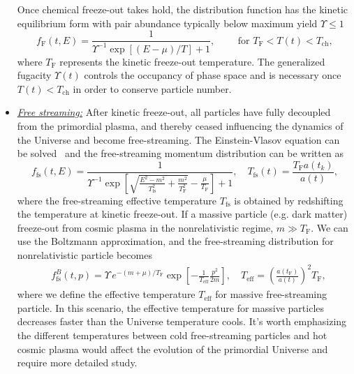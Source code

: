 \begin{itemize}
Once chemical freeze-out takes hold, the distribution function has the kinetic equilibrium form with pair abundance typically below maximum yield $\Upsilon \le 1$
\begin{equation}\label{kinetic_equilib}
f_\mathrm{F}(t,E)=\frac{1}{\Upsilon^{-1}\exp[(E-\mu)/T]+1},\qquad \text{ for }T_\mathrm{F}< T(t)< T_\mathrm{ch},
\end{equation}
where $T_\mathrm{F}$ represents the kinetic freeze-out temperature. The generalized fugacity $\Upsilon(t)$ controls the occupancy of phase space and is necessary once $T(t)<T_\mathrm{ch}$ in order to conserve particle number.
%
\item \underline{\it Free streaming:\/}
After kinetic freeze-out, all particles have fully decoupled from the primordial plasma, and thereby ceased influencing the dynamics of the Universe and become free-streaming. The Einstein-Vlasov equation can be solved~\cite{Choquet-Bruhat:2009xil} and the free-streaming momentum distribution can be written as~\cite{Birrell:2012gg}
\begin{equation}\label{free_stream_dist}
f_\mathrm{fs}(t,E)=\frac{1}{\Upsilon^{-1}\exp{\left[\sqrt{\frac{E^2-m^2}{T_\mathrm{fs}^2}+\frac{m^2}{T^2_\mathrm{F}}}-\frac{\mu}{T_\mathrm{F}}\right]+1}},\quad T_\mathrm{fs}(t)=\frac{T_\mathrm{F}a(t_k)}{a(t)},
\end{equation}
where the free-streaming effective temperature $T_\mathrm{fs}$ is obtained by redshifting the temperature at kinetic freeze-out. If a massive particle (e.g. dark matter) freeze-out from cosmic plasma in the nonrelativistic regime, $m\gg T_\mathrm{F}$. We can use the
Boltzmann approximation, and the free-streaming distribution for nonrelativistic particle becomes
\begin{align}
&f^B_\mathrm{fs}(t,p)=\Upsilon\,e^{-(m+\mu)/T_\mathrm{F}}\exp\left[-\frac{1}{ T_\mathrm{eff}}\frac{p^2}{2m}\right],\quad T_\mathrm{eff}=\left(\frac{a(t_\mathrm{F})}{a(t)}\right)^2T_\mathrm{F},
\end{align}
where we define the effective temperature $T_\mathrm{eff}$ for massive free-streaming particle. In this scenario, the effective temperature for massive particles decreases faster than the Universe temperature cools. It's worth emphasizing the different temperatures between cold free-streaming particles and hot cosmic plasma would affect the evolution of the primordial Universe and require more detailed study. 
\end{itemize}

